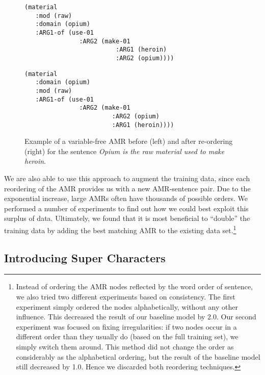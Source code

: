 \documentclass[a4paper,10pt,twoside]{article}
\begin{document}
\begin{figure*}[!htb]
{
  \begin{minipage}{0.5\textwidth}
  \begin{Verbatim}[commandchars=\\\{\}]
(material
   :mod (raw)
   :domain (opium)
   :ARG1-of (use-01
               :ARG2 (make-01
                         :ARG1 (heroin)
                         :ARG2 (opium))))
\end{Verbatim}
  \end{minipage}
  \begin{minipage}{0.5\textwidth}
  \begin{Verbatim}[commandchars=\\\{\}]
(material
   :domain (opium)
   :mod (raw)
   :ARG1-of (use-01
               :ARG2 (make-01
                        :ARG2 (opium)
                        :ARG1 (heroin))))
\end{Verbatim}
  \end{minipage}
  \caption{\label{fig:reshuffling}Example of a variable-free AMR before (left) and after re-ordering (right) for the sentence \emph{Opium is the raw material used to make heroin}.}
}
\end{figure*}

We are also able to use this approach to augment the training data, since each reordering of the AMR provides us with a new AMR-sentence pair. Due to the exponential increase, large AMRs often have thousands of possible orders. We performed a number of experiments to find out how we could best exploit this surplus of data. Ultimately, we found that it is most beneficial to ``double'' the training data by adding the best matching AMR to the existing data set.\footnote{Instead of ordering the AMR nodes reflected by the word order of sentence, we also tried two different experiments based on consistency. The first experiment simply ordered the nodes alphabetically, without any other influence. This decreased the result of our baseline model by 2.0. Our second experiment was focused on fixing irregularities: if two nodes occur in a different order than they usually do (based on the full training set), we simply switch them around. This method did not change the order as considerably as the alphabetical ordering, but the result of the baseline model still decreased by 1.0. Hence we discarded both reordering techniques.}

\subsection{Introducing Super Characters}
\end{document}
